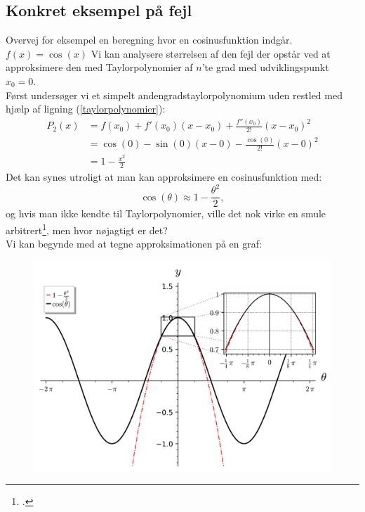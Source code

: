 \documentclass[12pt, a4paper]{article}
\begin{document}
\begin{refsection}
\subsection{Konkret eksempel på fejl} %
Overvej for eksempel en beregning hvor en cosinusfunktion indgår. $f(x)=\cos(x)$ Vi kan analysere størrelsen af den fejl der opstår ved at approksimere den med Taylorpolynomier af $n$'te grad med udviklingspunkt $x_0=0$.\\
Først undersøger vi et simpelt andengradstaylorpolynomium uden restled med hjælp af ligning (\ref{taylorpolynomier}):\\
 \begin{equation*}
    \begin{aligned}
        P_2(x)&=f(x_0)+f'(x_0)(x-x_0)+\frac{f''(x_0)}{2!}(x-x_0)^2\\
        &=\cos(0)-\sin(0)(x-0)-\frac{\cos(0)}{2!}(x-0)^2\\
        &=1-\frac{x^2}{2}
    \end{aligned}
\end{equation*}
Det kan synes utroligt at man kan approksimere en cosinusfunktion med:
\begin{equation*}\label{cosiunsanden}
    \cos(\theta)\approx 1-\frac{\theta^2}{2},
\end{equation*}
og hvis man ikke kendte til Taylorpolynomier, ville det nok virke en smule arbitrert\footcite{3blue1browntaylor}, men hvor nøjagtigt er det?\\
Vi kan begynde med at tegne approksimationen på en graf:
\begin{figure}[h!]
     \includegraphics[width=\textwidth]{figures/cosinuszoom.png}

\end{figure}
\end{refsection}
\end{document}
